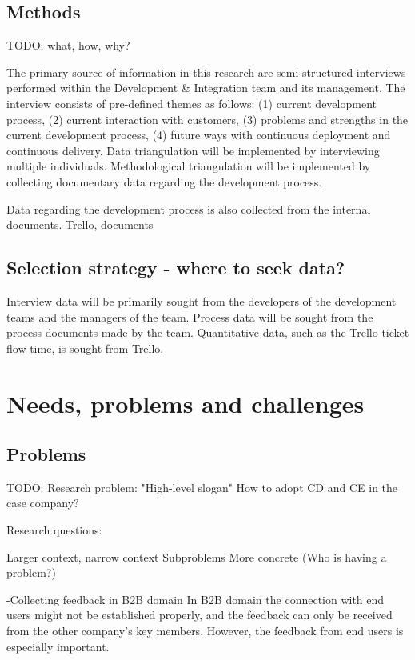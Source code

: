 \documentclass[english]{tktltiki2}
\theoremstyle{definition}
\theoremstyle{remark}
\begin{document}
\subsection{Methods} %
TODO: what, how, why?

The primary source of information in this research are semi-structured interviews performed within the Development & Integration team and its management. The interview consists of pre-defined themes as follows: (1) current development process, (2) current interaction with customers, (3) problems and strengths in the current development process, (4) future ways with continuous deployment and continuous delivery. Data triangulation will be implemented by interviewing multiple individuals. Methodological triangulation will be implemented by collecting documentary data regarding the development process.

Data regarding the development process is also collected from the internal documents.
Trello, documents

\subsection{Selection strategy - where to seek data?}

Interview data will be primarily sought from the developers of the development teams and the managers of the team. Process data will be sought from the process documents made by the team. Quantitative data, such as the Trello ticket flow time, is sought from Trello. 

\section{Needs, problems and challenges}

\subsection{Problems} %

TODO:
Research problem: "High-level slogan"
How to adopt CD and CE in the case company?

Research questions:

Larger context, narrow context
Subproblems
More concrete (Who is having a problem?)

-Collecting feedback in B2B domain
  In B2B domain the connection with end users might not be established properly, and the feedback can only be received from the other company's key members. However, the feedback from end users is especially important. 
\end{document}

